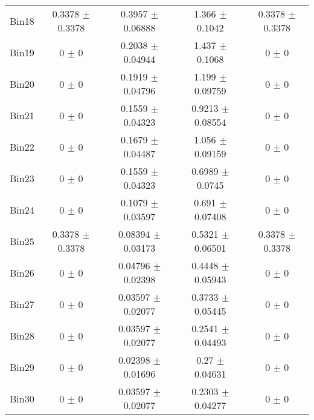 \begin{tabular}{@{\extracolsep{4pt}}lcccc@{}}
     Bin18 & 0.3378 $\pm$ 0.3378 & 0.3957 $\pm$ 0.06888 & 1.366 $\pm$ 0.1042 & 0.3378 $\pm$ 0.3378 \\ 
     Bin19 & 0 $\pm$ 0 & 0.2038 $\pm$ 0.04944 & 1.437 $\pm$ 0.1068 & 0 $\pm$ 0 \\ 
     Bin20 & 0 $\pm$ 0 & 0.1919 $\pm$ 0.04796 & 1.199 $\pm$ 0.09759 & 0 $\pm$ 0 \\ 
     Bin21 & 0 $\pm$ 0 & 0.1559 $\pm$ 0.04323 & 0.9213 $\pm$ 0.08554 & 0 $\pm$ 0 \\ 
     Bin22 & 0 $\pm$ 0 & 0.1679 $\pm$ 0.04487 & 1.056 $\pm$ 0.09159 & 0 $\pm$ 0 \\ 
     Bin23 & 0 $\pm$ 0 & 0.1559 $\pm$ 0.04323 & 0.6989 $\pm$ 0.0745 & 0 $\pm$ 0 \\ 
     Bin24 & 0 $\pm$ 0 & 0.1079 $\pm$ 0.03597 & 0.691 $\pm$ 0.07408 & 0 $\pm$ 0 \\ 
     Bin25 & 0.3378 $\pm$ 0.3378 & 0.08394 $\pm$ 0.03173 & 0.5321 $\pm$ 0.06501 & 0.3378 $\pm$ 0.3378 \\ 
     Bin26 & 0 $\pm$ 0 & 0.04796 $\pm$ 0.02398 & 0.4448 $\pm$ 0.05943 & 0 $\pm$ 0 \\ 
     Bin27 & 0 $\pm$ 0 & 0.03597 $\pm$ 0.02077 & 0.3733 $\pm$ 0.05445 & 0 $\pm$ 0 \\ 
     Bin28 & 0 $\pm$ 0 & 0.03597 $\pm$ 0.02077 & 0.2541 $\pm$ 0.04493 & 0 $\pm$ 0 \\ 
     Bin29 & 0 $\pm$ 0 & 0.02398 $\pm$ 0.01696 & 0.27 $\pm$ 0.04631 & 0 $\pm$ 0 \\ 
     Bin30 & 0 $\pm$ 0 & 0.03597 $\pm$ 0.02077 & 0.2303 $\pm$ 0.04277 & 0 $\pm$ 0 \\ 
\hline\hline
  \end{tabular}
